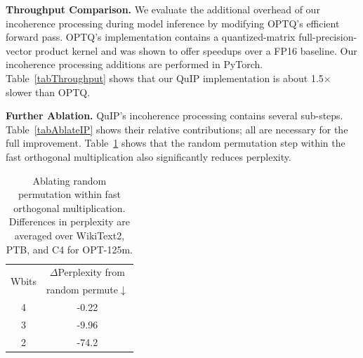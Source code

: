 \textbf{Throughput Comparison.}
We evaluate the additional overhead of our incoherence processing during model inference by modifying OPTQ's efficient forward pass.
OPTQ's implementation contains a quantized-matrix full-precision-vector product kernel and was shown to offer speedups over a FP16 baseline.
Our incoherence processing additions are performed in PyTorch.
Table~\ref{tabThroughput} shows that our QuIP implementation is about 1.5$\times$ slower than OPTQ.





\textbf{Further Ablation.}
QuIP's incoherence processing contains several sub-steps.
Table~\ref{tabAblateIP} shows their relative contributions; all are necessary for the full improvement.
Table~\ref{tabAblateRandPermute} shows that the random permutation step within the fast orthogonal multiplication also significantly reduces perplexity.

\begin{table}
\centering
\begin{tabular}{cc}
\multirow{2}{*}{Wbits} & $\Delta$Perplexity from  \\
& random permute$\downarrow$ \\
\hline
4\Tstrut & -0.22 \\
3 & -9.96 \\
2 & -74.2
\end{tabular}
\caption{
Ablating random permutation within fast orthogonal multiplication.
Differences in perplexity are averaged over WikiText2, PTB, and C4 for OPT-125m.
}
\label{tabAblateRandPermute}
\end{table}
